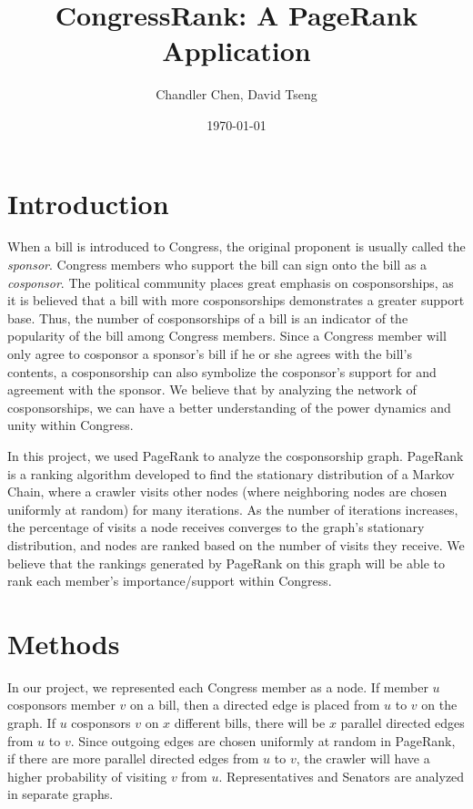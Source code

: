 \documentclass[11pt]{article}
\begin{document}
\title{CongressRank: A PageRank Application}
\author{Chandler Chen, David Tseng}
\date{\today}
\maketitle

\section*{Introduction}
When a bill is introduced to Congress, the original proponent is usually called the \textit{sponsor}. Congress members who support the bill can sign onto the bill as a \textit{cosponsor}. The political community places great emphasis on cosponsorships, as it is believed that a bill with more cosponsorships demonstrates a greater support base. Thus, the number of cosponsorships of a bill is an indicator of the popularity of the bill among Congress members. Since a Congress member will only agree to cosponsor a sponsor's bill if he or she agrees with the bill's contents, a cosponsorship can also symbolize the cosponsor's support for and agreement with the sponsor. We believe that by analyzing the network of cosponsorships, we can have a better understanding of the power dynamics and unity within Congress. 

In this project, we used PageRank to analyze the cosponsorship graph. PageRank is a ranking algorithm developed to find the stationary distribution of a Markov Chain, where a crawler visits other nodes (where neighboring nodes are chosen uniformly at random) for many iterations. As the number of iterations increases, the percentage of visits a node receives converges to the graph's stationary distribution, and nodes are ranked based on the number of visits they receive. We believe that the rankings generated by PageRank on this graph will be able to rank each member's importance/support within Congress. 




\section*{Methods}
In our project, we represented each Congress member as a node. If member $u$ cosponsors member $v$ on a bill, then a directed edge is placed from $u$ to $v$ on the graph. If $u$ cosponsors $v$ on $x$ different bills, there will be $x$ parallel directed edges from $u$ to $v$. Since outgoing edges are chosen uniformly at random in PageRank, if there are more parallel directed edges from $u$ to $v$, the crawler will have a higher probability of visiting $v$ from $u$. Representatives and Senators are analyzed in separate graphs. 
\end{document}

